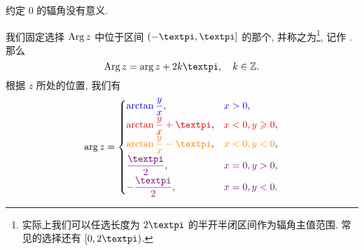 \alert{约定 $0$ 的辐角没有意义.}


我们固定选择 $\operatorname{Arg} z$ 中位于区间 $(-\cpi,\cpi]$ 的那个, 并称之为\footnote{%
  实际上我们可以任选长度为 $2\cpi$ 的半开半闭区间作为辐角主值范围. 常见的选择还有 $[0,2\cpi)$.
}, 记作 .
那么
\[
  \Arg z=\arg z+2k\cpi, \quad k\in\BZ.
\]
根据 $z$ 所处的位置, 我们有
\begin{equation}
  \label{eq:arg}
  \arg z=\begin{cases}
    {\color{main}\arctan\dfrac yx},&
      {\color{main}x>0},\\[4pt]
    {\color{second}\arctan\dfrac yx+\cpi},&
      {\color{second}x<0,y\ge0},\\[4pt]
    {\color{fifth}\arctan\dfrac yx-\cpi},&
      {\color{fifth}x<0,y<0},\\[4pt]
    {\color{third}\dfrac\cpi2},&
      {\color{third}x=0,y>0},\\[4pt]
    {\color{third}-\dfrac\cpi2},&
      {\color{third}x=0,y<0}.
  \end{cases}
\end{equation}



